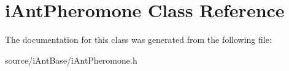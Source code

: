 \hypertarget{classi_ant_pheromone}{}\section{i\+Ant\+Pheromone Class Reference}
\label{classi_ant_pheromone}


The documentation for this class was generated from the following file\+:\begin{DoxyCompactItemize}
\item 
source/i\+Ant\+Base/i\+Ant\+Pheromone.\+h\end{DoxyCompactItemize}
